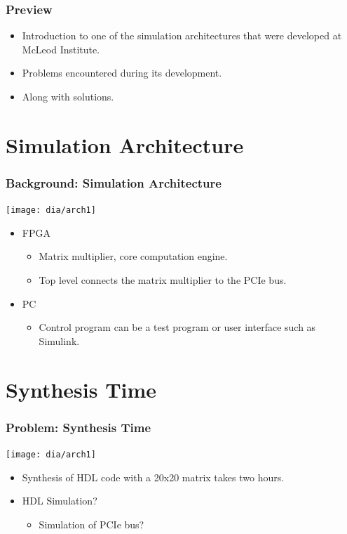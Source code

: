 \documentclass[gray]{beamer}
\begin{document}

\begin{frame}
\frametitle{Preview}
\begin{itemize}
\item Introduction to one of the simulation architectures that were
	developed at McLeod Institute.
\item Problems encountered during its development.
\item Along with solutions.
\end{itemize}
\end{frame}

\section{Simulation Architecture}
\begin{frame}
\frametitle{Background: Simulation Architecture}
\begin{center}
\texttt{[image: dia/arch1]}
\begin{itemize}
\item FPGA
\begin{itemize}
\item Matrix multiplier, core computation engine.
\item Top level connects the matrix multiplier to the PCIe bus.
\end{itemize}
\item PC
\begin{itemize}
\item Control program can be a test program or user interface such as Simulink.
\end{itemize}
\end{itemize}
\end{center}
\end{frame}

\section{Synthesis Time}

\begin{frame}
\frametitle{Problem: Synthesis Time}
\begin{center}
\texttt{[image: dia/arch1]}
\begin{itemize}
\item Synthesis of HDL code with a 20x20 matrix takes two hours.
\item HDL Simulation?
	\begin{itemize}
	\item Simulation of PCIe bus?
	\end{itemize}
\end{itemize}
\end{center}
\end{frame}
\end{document}
